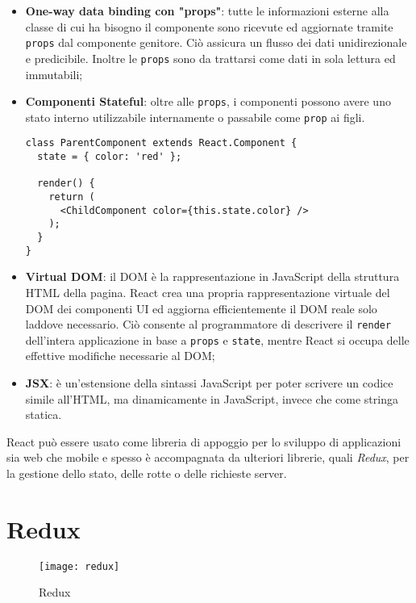 \begin{itemize}
  \item \textbf{One-way data binding con "props"}: tutte le informazioni esterne alla classe di cui ha bisogno il componente sono ricevute ed aggiornate tramite \texttt{props} dal componente genitore. Ciò assicura un flusso dei dati unidirezionale e predicibile. Inoltre le \texttt{props} sono da trattarsi come dati in sola lettura ed immutabili;
  \item \textbf{Componenti Stateful}: oltre alle \texttt{props}, i componenti possono avere uno stato interno utilizzabile internamente o passabile come \texttt{prop} ai figli.

  \vfill

    \begin{lstlisting}[language={[Sharp]C}]
class ParentComponent extends React.Component {
  state = { color: 'red' };

  render() {
    return (
      <ChildComponent color={this.state.color} />
    );
  }
}
    \end{lstlisting}

  \item \textbf{Virtual DOM}: il DOM è la rappresentazione in JavaScript della struttura HTML della pagina. React crea una propria rappresentazione virtuale del DOM dei componenti UI ed aggiorna efficientemente il DOM reale solo laddove necessario. Ciò consente al programmatore di descrivere il \texttt{render} dell'intera applicazione in base a \texttt{props} e \texttt{state}, mentre React si occupa delle effettive modifiche necessarie al DOM;
  \item \textbf{JSX}: è un'estensione della sintassi JavaScript per poter scrivere un codice simile all'HTML, ma dinamicamente in JavaScript, invece che come stringa statica.
\end{itemize}

React può essere usato come libreria di appoggio per lo sviluppo di applicazioni sia web che mobile e spesso è accompagnata da ulteriori librerie, quali \textit{Redux}, per la gestione dello stato, delle rotte o delle richieste server.

\section{Redux}

\begin{figure}[H] 
  \centering 
  \texttt{[image: redux]} 
  \caption{Redux}
\end{figure}

